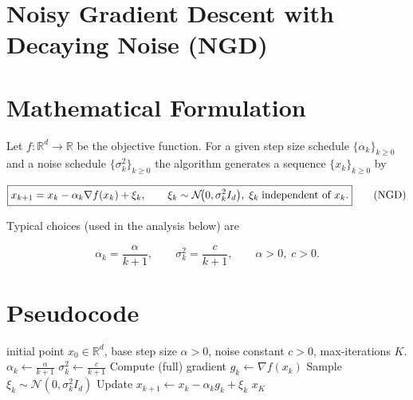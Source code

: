 \documentclass{article}
\newcommand{\R}{\mathbb{R}}
\begin{document}
\section*{Noisy Gradient Descent with Decaying Noise (NGD)}

\section*{Mathematical Formulation}
Let $f:\R^{d}\to\R$ be the objective function.  
For a given step size schedule $\{\alpha_k\}_{k\ge 0}$ and a noise schedule $\{\sigma_k^2\}_{k\ge 0}$ the algorithm generates a sequence $\{x_k\}_{k\ge 0}$ by  

\[
\boxed{%
x_{k+1}=x_k-\alpha_k \nabla f(x_k)+\xi_k,\qquad 
\xi_k\sim\mathcal N\!\big(0,\sigma_k^{2} I_d\big),\; \xi_k\;\text{independent of }x_k.}
\tag{NGD}
\]

Typical choices (used in the analysis below) are  

\[
\alpha_k=\frac{\alpha}{k+1},\qquad 
\sigma_k^{2}= \frac{c}{k+1},\qquad \alpha>0,\;c>0.
\]

\section*{Pseudocode}
\begin{algorithm}[H]
\caption{Noisy Gradient Descent with Decaying Noise}
\begin{algorithmic}[1]
 initial point $x_0\in\R^{d}$, base step size $\alpha>0$, noise constant $c>0$, max‑iterations $K$.
    \STATE $\displaystyle \alpha_k\gets \frac{\alpha}{k+1}$ 
    \STATE $\displaystyle \sigma_k^{2}\gets \frac{c}{k+1}$ 
    \STATE Compute (full) gradient $g_k\gets \nabla f(x_k)$
    \STATE Sample $\xi_k\sim\mathcal N(0,\sigma_k^{2}I_d)$
    \STATE Update $x_{k+1}\gets x_k-\alpha_k g_k+\xi_k$
\ENDFOR
{} $x_{K}$
\end{algorithmic}
\end{algorithm}
\end{document}
